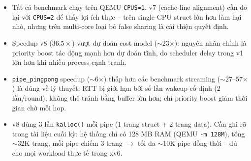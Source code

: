 \documentclass[11pt,a4paper]{article}
\begin{document}
\begin{itemize}
  \item Tất cả benchmark chạy trên QEMU \texttt{CPUS=1}. v7 (cache-line alignment) cần đo lại với \texttt{CPUS=2} để thấy lợi ích thực -- trên single-CPU struct lớn hơn làm hại nhỏ, nhưng trên multi-core loại bỏ false sharing là cải thiện quyết định.
  \item Speedup v8 ($36.5\times$) vượt dự đoán cost model ($\sim$23$\times$): nguyên nhân chính là priority boost tác động mạnh hơn dự đoán tĩnh, do scheduler delay trong v1 lớn hơn khi nhiều process cạnh tranh.
  \item \texttt{pipe\_pingpong} speedup ($\sim$6$\times$) thấp hơn các benchmark streaming ($\sim$27--57$\times$) là đúng về lý thuyết: RTT bị giới hạn bởi số lần wakeup cố định (2 lần/round), không thể tránh bằng buffer lớn hơn; chỉ priority boost giảm thời gian chờ mỗi hop.
  \item v8 dùng 3 lần \texttt{kalloc()} mỗi pipe (1 trang struct + 2 trang data). Cần ghi rõ trong tài liệu cuối kỳ: hệ thống chỉ có 128 MB RAM (QEMU \texttt{-m 128M}), tổng $\sim$32K trang, mỗi pipe chiếm 3 trang $\rightarrow$ tối đa $\sim$10K pipe đồng thời -- đủ cho mọi workload thực tế trong xv6.
\end{itemize}
\end{document}
